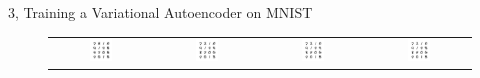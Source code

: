 \documentclass[10pt,a4paper]{article}
\begin{document}
\begin{task}{3, Training a Variational Autoencoder on MNIST}
\begin{enumerate}
\begin{figure}[H]
\begin{tabular}{cccc}
    \includegraphics[width=0.23\textwidth]{../plots/task3/reconstructed_epochs1_latent2.png} &   \includegraphics[width=0.23\textwidth]{../plots/task3/reconstructed_epochs5_latent2.png} & \includegraphics[width=0.23\textwidth]{../plots/task3/reconstructed_epochs25_latent2.png} &   \includegraphics[width=0.23\textwidth]{../plots/task3/reconstructed_epochs50_latent2.png} \\

\end{tabular}
\end{figure}
\end{enumerate}
\end{task}
\end{document}
